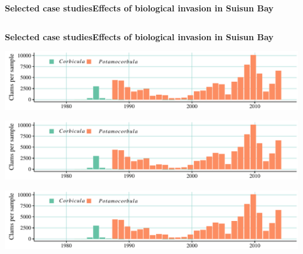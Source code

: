 \documentclass[serif]{beamer}\usepackage[]{graphicx}\usepackage[]{color}
\begin{document}
\begin{frame}{\textbf{Selected case studies}}{\textbf{Effects of biological invasion in Suisun Bay}}
\begin{columns}
\begin{column}{0.5\textwidth}
{}
\end{column}
\begin{column}{0.5\textwidth}
\end{column}
\end{columns}
\end{frame}



\begin{frame}{\textbf{Selected case studies}}{\textbf{Effects of biological invasion in Suisun Bay}}
\centerline{\includegraphics[width = 0.97\textwidth, page = 1]{fig/d7links.pdf}}
\centerline{\includegraphics[width = 0.97\textwidth, page = 2]{fig/d7links.pdf}}
\centerline{\includegraphics[width = 0.97\textwidth, page = 3]{fig/d7links.pdf}}
\end{frame}
\end{document}
